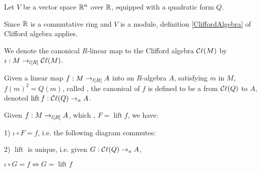 \begin{example}
  \label{ex:clifford_algebra_v}

  Let $V$ be a vector space $\mathbb R^n$ over $\mathbb R$, equipped with a quadratic form $Q$.
  
  Since $\mathbb R$ is a commutative ring and $V$ is a module,
  definition \ref{CliffordAlgebra} of Clifford algebra applies.
\end{example}

\begin{definition}
  \label{iota}
  \leanok

  We denote the canonical $R$-linear map to the Clifford algebra $\mathop{\mathcal{C}\ell}(M)$ by $\iota : M \to_{l[R]} \mathop{\mathcal{C}\ell}(M)$.

\end{definition}

\begin{definition}
  \label{lift}
  \leanok

  Given a linear map $f : M \to_{l[R]} A$ into an $R$-algebra $A$, satisfying \forall $m$ in $M$, $f(m)^2 = Q(m)$,
  called ,
  the canonical  of $f$ is defined to be a  from $\mathop{\mathcal{C}\ell}(Q)$ to $A$,
  denoted $\operatorname{lift} f : \mathop{\mathcal{C}\ell}(Q) \to_{a} A$.

\end{definition}

\begin{theorem}
  \label{univ}
  \leanok

  Given $f : M \to_{l[R]} A$, which , $F = \operatorname{lift} f$, we have:

  1) $\iota \circ F = f$, i.e. the following diagram commutes:

  \begin{figure}[H]
    \centering
  \end{figure}

  2) $\operatorname{lift}$ is unique, i.e. given $G : \mathop{\mathcal{C}\ell}(Q) \to_{a} A$, 

  $\iota \circ G = f \iff G = \operatorname{lift} f$

\end{theorem}


